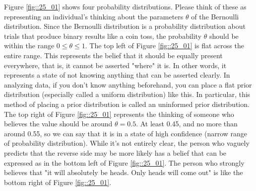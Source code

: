 \documentclass{ltjsbook}
\begin{document}
Figure \ref{fig::25_01} shows four probability distributions. Please think of these as representing an individual's thinking about the parameters $\theta$ of the Bernoulli distribution. Since the Bernoulli distribution is a probability distribution about trials that produce binary results like a coin toss, the probability $\theta$ should be within the range $0 \le \theta \le 1$.
The top left of Figure \ref{fig::25_01} is flat across the entire range. This represents the belief that it should be equally present everywhere, that is, it cannot be asserted "where" it is. In other words, it represents a state of not knowing anything that can be asserted clearly. In analyzing data, if you don't know anything beforehand, you can place a flat prior distribution (especially called a uniform distribution) like this. In particular, this method of placing a prior distribution is called an uninformed prior distribution.
The top right of Figure \ref{fig::25_01} represents the thinking of someone who believes the value should be around $\theta=0.5$. At least 0.45, and no more than around 0.55, so we can say that it is in a state of high confidence (narrow range of probability distribution).
While it's not entirely clear, the person who vaguely predicts that the reverse side may be more likely has a belief that can be expressed as in the bottom left of Figure \ref{fig::25_01}. The person who strongly believes that "it will absolutely be heads. Only heads will come out" is like the bottom right of Figure \ref{fig::25_01}.
\end{document}
